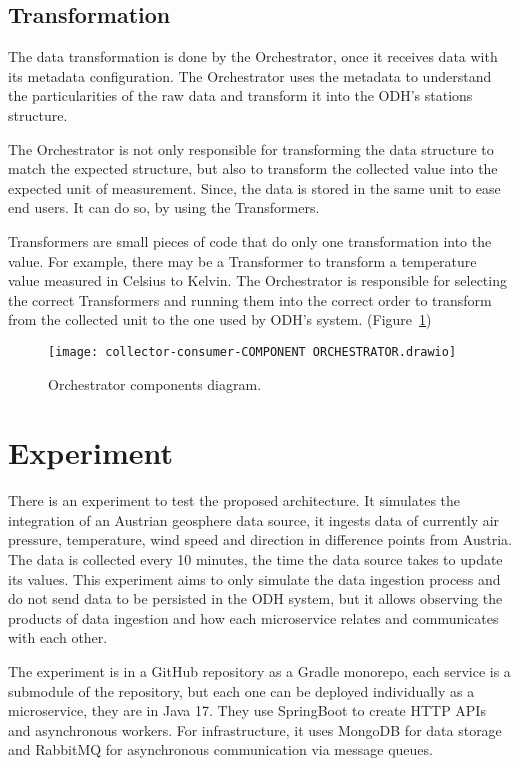 \subsection{Transformation}
\label{sec:transformation}

The data transformation is done by the Orchestrator, once it receives data with its metadata configuration. The Orchestrator uses the metadata to understand the particularities of the raw data and transform it into the ODH's stations structure.

The Orchestrator is not only responsible for transforming the data structure to match the expected structure, but also to transform the collected value into the expected unit of measurement. Since, the data is stored in the same unit to ease end users. It can do so, by using the Transformers.

Transformers are small pieces of code that do only one transformation into the value. For example, there may be a Transformer to transform a temperature value measured in Celsius to Kelvin. The Orchestrator is responsible for selecting the correct Transformers and running them into the correct order to transform from the collected unit to the one used by ODH's system. (Figure~\ref{fig:orchestrator})

\begin{figure}
    \centering
    \texttt{[image: collector-consumer-COMPONENT ORCHESTRATOR.drawio]}
    \caption{Orchestrator components diagram.\label{fig:orchestrator}}
\end{figure}

\section{Experiment}
\label{sec:exp}

There is an experiment to test the proposed architecture. It simulates the integration of an Austrian geosphere data source, it ingests data of currently air pressure, temperature, wind speed and direction in difference points from Austria. The data is collected every 10 minutes, the time the data source takes to update its values. This experiment aims to only simulate the data ingestion process and do not send data to be persisted in the ODH system, but it allows observing the products of data ingestion and how each microservice relates and communicates with each other.

The experiment is in a GitHub repository as a Gradle monorepo, each service is a submodule of the repository, but each one can be deployed individually as a microservice, they are in Java 17. They use SpringBoot to create HTTP APIs and asynchronous workers. For infrastructure, it uses MongoDB for data storage and RabbitMQ for asynchronous communication via message queues.

